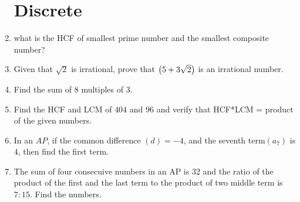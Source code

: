 \begin{enumerate}
	\section{Discrete}
	\item what is the HCF of smallest prime number and the smallest composite number?
	\item Given that $\sqrt{2}$ is irrational, prove that $\left(5+3\sqrt2\right)$ is an irrational number.
	\item Find the sum of $8$ multiples of $3$.
	\item Find the HCF and LCM of $404$ and $96$ and verify that HCF*LCM = product of the given numbers.

			\item In an $AP$, if the common difference $(d) = -4$, and the seventh term$(a_7)$ is $4$, then find the first term.		
			\item The sum of four consecuive numbers in an AP is $32$ and the ratio of the product of the first and the last term to the product of two middle term is $7:15$. Find the numbers.
\end{enumerate}	